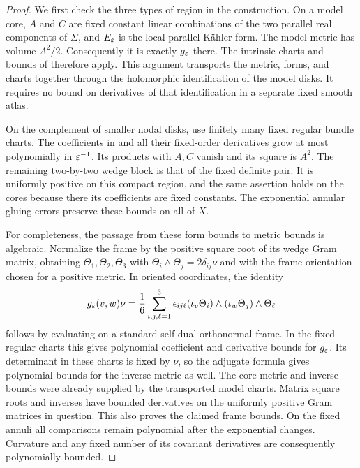 \begin{proof}
We first check the three types of region in the construction.  On a
model core, $A$ and $C$ are fixed constant linear combinations of the
two parallel real components of $\Sigma$, and $E_\varepsilon$ is the local
parallel K\"ahler form.  The model metric has volume $A^2/2$.
Consequently it is exactly $g_\varepsilon$ there.  The intrinsic charts and
bounds of  therefore apply.  This argument
transports the metric, forms, and charts together through the
holomorphic identification of the model disks.  It requires no bound
on derivatives of that identification in a separate fixed smooth
atlas.

On the complement of smaller nodal disks, use finitely many fixed
regular bundle charts.  The coefficients in
 and all their fixed-order derivatives
grow at most polynomially in $\varepsilon^{-1}$.  Its products with $A,C$
vanish and its square is $A^2$.  The remaining two-by-two wedge block
is that of the fixed definite pair.  It is uniformly positive on this
compact region, and the same assertion holds on the cores because
there its coefficients are fixed constants.  The exponential annular
gluing errors preserve these bounds on all of $X$.

For completeness, the passage from these form bounds to metric bounds
is algebraic.  Normalize the frame by the positive square root of its
wedge Gram matrix, obtaining $\Theta_1,\Theta_2,\Theta_3$ with
$\Theta_i\wedge\Theta_j=2\delta_{ij}\nu$ and with the frame orientation
chosen for a positive metric.  In oriented coordinates, the identity
\begin{equation}
  g_\varepsilon(v,w)\nu
   =\frac16\sum_{i,j,\ell=1}^3
       \epsilon_{ij\ell}
       (\iota_v\Theta_i)\wedge(\iota_w\Theta_j)\wedge\Theta_\ell
  \label{eq:auxiliary-metric-algebra}
\end{equation}
follows by evaluating on a standard self-dual orthonormal frame.
In the fixed regular charts this gives polynomial coefficient and
derivative bounds for $g_\varepsilon$.  Its determinant in these charts is
fixed by $\nu$, so the adjugate formula gives polynomial bounds for
the inverse metric as well.  The core metric and inverse bounds were
already supplied by the transported model charts.  Matrix square
roots and inverses have bounded derivatives on the uniformly positive
Gram matrices in question.  This also proves the claimed frame
bounds.  On the fixed annuli all comparisons remain polynomial after
the exponential changes.  Curvature and any fixed number of its
covariant derivatives are consequently polynomially bounded.


\end{proof}
